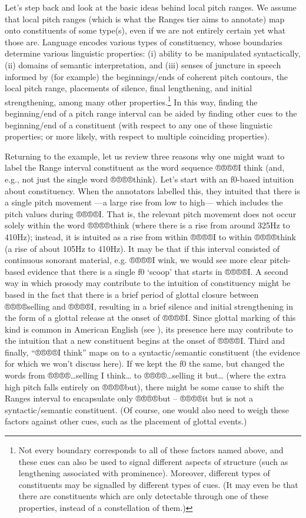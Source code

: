 \documentclass[11pt, twoside]{memoir}
\begin{document}
Let’s step back and look at the basic ideas behind local pitch ranges. We assume that local pitch ranges (which is what the Ranges tier aims to annotate) map onto constituents of some type(s), even if we are not entirely certain yet what those are. Language encodes various types of constituency, whose boundaries determine various linguistic properties: (i) ability to be manipulated syntactically, (ii) domains of semantic interpretation, and (iii) senses of juncture in speech informed by (for example) the beginnings\slash ends of coherent pitch contours, the local pitch range, placements of silence, final lengthening, and initial strengthening, among many other properties.\footnote{Not every boundary corresponds to all of these factors named above, and these cues can also be used to signal different aspects of structure (such as lengthening associated with prominence). Moreover, different types of constituents may be signalled by different types of cues. (It may even be that there are constituents which are only detectable through one of these properties, instead of a constellation of them.)} In this way, finding the beginning\slash end of a pitch range interval can be aided by finding other cues to the beginning\slash end of a constituent (with respect to any one of these linguistic properties; or more likely, with respect to multiple coinciding properties).

Returning to the example, let us review three reasons why one might want to label the Range interval constituent as the word sequence ®®®®{I think} (and, e.g., not just the single word ®®®®{think}). Let’s start with an f0-based intuition about constituency. When the annotators labelled this, they intuited that there is a single pitch movement —a large rise from low to high— which includes the pitch values during ®®®®{I}. That is, the relevant pitch movement does not occur solely within the word ®®®®{think} (where there is a rise from around 325Hz to 410Hz); instead, it is intuited as a rise from within ®®®®{I} to within ®®®®{think} (a rise of about 105Hz to 410Hz). It may be that if this interval consisted of continuous sonorant material, e.g. ®®®®{I wink}, we would see more clear pitch-based evidence that there is a single f0 ‘scoop’ that starts in ®®®®{I}. A second way in which prosody may contribute to the intuition of constituency might be based in the fact that there is a brief period of glottal closure between ®®®®{selling} and ®®®®{I}, resulting in a brief silence and initial strengthening in the form of a glottal release at the onset of ®®®®{I}. Since glottal marking of this kind is common in American English (see \citealt{dilley-96}), its presence here may contribute to the intuition that a new constituent begins at the onset of ®®®®{I}. Third and finally, “®®®®{I think}” maps on to a syntactic\slash semantic constituent (the evidence for which we won’t discuss here). If we kept the f0 the same, but changed the words from ®®®®{…selling I think…} to ®®®®{…selling it but…} (where the extra high pitch falls entirely on ®®®®{but}), there might be some cause to shift the Ranges interval to encapsulate only ®®®®{but} – ®®®®{it but} is not a syntactic\slash semantic constituent. (Of course, one would also need to weigh these factors against other cues, such as the placement of glottal events.)
\end{document}

